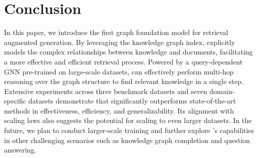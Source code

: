 \section{Conclusion}\label{sec:conclusion}
In this paper, we introduce the first graph foundation model for retrieval augmented generation. By leveraging the knowledge graph index, \ourmethod explicitly models the complex relationships between knowledge and documents, facilitating a more effective and efficient retrieval process. Powered by a query-dependent GNN pre-trained on large-scale datasets, \ourmethod can effectively perform multi-hop reasoning over the graph structure to find relevant knowledge in a single step. Extensive experiments across three benchmark datasets and seven domain-specific datasets demonstrate that \ourmethod significantly outperforms state-of-the-art methods in effectiveness, efficiency, and generalizability. Its alignment with scaling laws also suggests the potential for scaling to even larger datasets. In the future, we plan to conduct larger-scale training and further explore \ourmethod's capabilities in other challenging scenarios such as knowledge graph completion and question answering.
